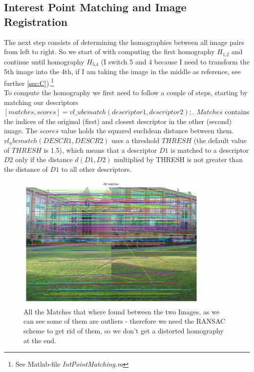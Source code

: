 \documentclass[subfigure,epsfig,fleqn,float,numbers=noenddot]{scrartcl}
\begin{document}
\subsection{Interest Point Matching and Image Registration}
\label{sec:B}
The next step consists of determining the homographies between all image pairs from left to right. So we start of with computing the first homography $H_\text{1,2}$ and continue until homography $H_\text{5,4}$ (I switch 5 and 4 because I need to transform the 5th image into the 4th, if I am taking the image in the middle as reference, see further \ref{sec:C}).\footnote{See Matlab-file \emph{IntPointMatching.m} } \\
To compute the homography we first need to follow a couple of steps, starting by matching our descriptors $[matches, scores] = vl\_ubcmatch(descriptor1, descriptor2);$. $Matches$ contains the indices of the original (first) and closest descriptor in the other (second) image. The $scores$ value holds the squared euclidean distance between them.  $vl_ubcmatch(DESCR1, DESCR2)$ uses a threshold $THRESH$ (the default value of $THRESH$ is 1.5), which means that a descriptor $D1$ is matched to a descriptor $D2$ only if the distance $d(D1,D2)$ multiplied by THRESH is not greater than the distance of $D1$ to all other descriptors.\\
	\begin{figure}[H]
		\centering
		\includegraphics[width=0.85\textwidth]{./img/allMatches.jpg}
		\caption{All the Matches that where found between the two Images, as we can see some of them are outliers - therefore we need the RANSAC scheme to get rid of them, so we don't get a distorted homography at the end.}
		\label{img:outliers}
	\end{figure}
\end{document}
